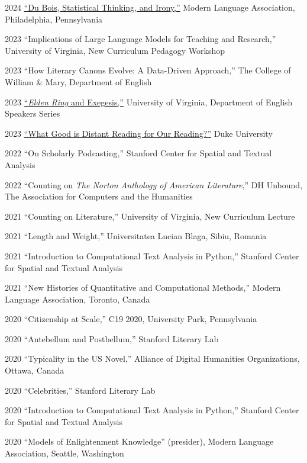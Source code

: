 \documentclass[12pt,letterpaper]{report}
\begin{document}
\begin{tablist}
	\item[2024] \tab{}\href{https://fredner.org/files/mla24.html}{\enquote{Du Bois, Statistical Thinking, and Irony,}} Modern Language Association, Philadelphia, Pennsylvania
	\item[2023] \tab{}\enquote{Implications of Large Language Models for Teaching and Research,} University of Virginia, New Curriculum Pedagogy Workshop
	\item[2023] \tab{}\enquote{How Literary Canons Evolve: A Data-Driven Approach,} The College of William \& Mary, Department of English
	\item[2023] \tab{}\href{https://fredner.org/er/}{\enquote{\emph{Elden Ring} and Exegesis,}} University of Virginia, Department of English Speakers Series
	\item[2023] \tab{}\href{https://fredner.org/duke/}{\enquote{What Good is Distant Reading for Our Reading?}} Duke University
	\item[2022] \tab{}\enquote{On Scholarly Podcasting,} Stanford Center for Spatial and Textual Analysis
	\item[2022] \tab{}\enquote{Counting on \emph{The Norton Anthology of American Literature},} DH Unbound, The Association for Computers and the Humanities
	\item[2021] \tab{}\enquote{Counting on Literature,} University of Virginia, New Curriculum Lecture
	\item[2021] \tab{}\enquote{Length and Weight,} Universitatea Lucian Blaga, Sibiu, Romania
	\item[2021] \tab{}\enquote{Introduction to Computational Text Analysis in Python,} Stanford Center for Spatial and Textual Analysis
	\item[2021] \tab{}\enquote{New Histories of Quantitative and Computational Methods,} Modern Language Association, Toronto, Canada
	\item[2020] \tab{}\enquote{Citizenship at Scale,} C19 2020, University Park, Pennsylvania
	\item[2020] \tab{}\enquote{Antebellum and Postbellum,} Stanford Literary Lab
	\item[2020] \tab{}\enquote{Typicality in the US Novel,} Alliance of Digital Humanities Organizations, Ottawa, Canada
	\item[2020] \tab{}\enquote{Celebrities,} Stanford Literary Lab
	\item[2020] \tab{}\enquote{Introduction to Computational Text Analysis in Python,} Stanford Center for Spatial and Textual Analysis
	\item[2020] \tab{}\enquote{Models of Enlightenment Knowledge} (presider), Modern Language Association, Seattle, Washington

\end{tablist}
\end{document}
